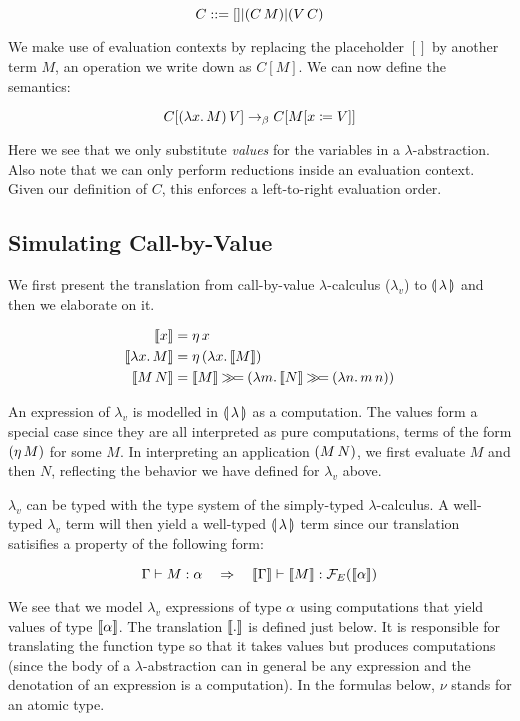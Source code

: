 $$
C ::= [] | (C\,M) | (V\,C)
$$

We make use of evaluation contexts by replacing the placeholder $[]$ by
another term $M$, an operation we write down as $C[M]$. We can now define
the semantics:

$$
C[(\lambda x.\, M)\,V] \to_\beta C[M[x \coloneqq V]]
$$

Here we see that we only substitute \emph{values} for the variables in a
$\lambda$-abstraction. Also note that we can only perform reductions inside
an evaluation context. Given our definition of $C$, this enforces a
left-to-right evaluation order.

\subsection{Simulating Call-by-Value}

We first present the translation from call-by-value $\lambda$-calculus
($\lambda_v$) to $\llparenthesis \, \lambda \, \rrparenthesis$ and then we elaborate on it.

\begin{align*}
  \llbracket x \rrbracket &= \eta\,x \\
  \llbracket \lambda x.\, M \rrbracket &= \eta\,(\lambda x.\, \llbracket M \rrbracket) \\
  \llbracket M\,N \rrbracket &= \llbracket M \rrbracket \mathbin{\gg\!=} (\lambda m.\, \llbracket N \rrbracket \mathbin{\gg\!=} (\lambda n.\, m\,n))
\end{align*}

An expression of $\lambda_v$ is modelled in $\llparenthesis \, \lambda \, \rrparenthesis$ as a
computation. The values form a special case since they are all interpreted
as pure computations, terms of the form $(\eta\,M)$ for some $M$. In
interpreting an application $(M\,N)$, we first evaluate $M$ and then
$N$, reflecting the behavior we have defined for $\lambda_v$ above.

$\lambda_v$ can be typed with the type system of the simply-typed
$\lambda$-calculus. A well-typed $\lambda_v$ term will then yield a
well-typed $\llparenthesis \, \lambda \, \rrparenthesis$ term since our translation satisifies a
property of the following form:

$$
\Gamma \vdash M : \alpha
\quad \Rightarrow \quad
\llbracket \Gamma \rrbracket \vdash \llbracket M \rrbracket : \mathcal{F}_E(\llbracket \alpha \rrbracket)
$$

We see that we model $\lambda_v$ expressions of type $\alpha$ using
computations that yield values of type $\llbracket \alpha \rrbracket$. The translation
$\llbracket . \rrbracket$ is defined just below. It is responsible for translating the
function type so that it takes values but produces computations (since the
body of a $\lambda$-abstraction can in general be any expression and the
denotation of an expression is a computation). In the formulas below, $\nu$
stands for an atomic type.

